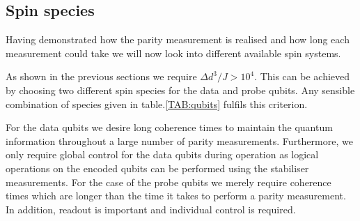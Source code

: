 
\subsection{Spin species}

Having demonstrated how the parity measurement is realised and how long each measurement could take we will now look into different available spin systems. 

As shown in the previous sections we require \hbox{$\Delta d^3/ J > 10^4$}. This can be achieved by choosing two different spin species for the data and probe qubits. Any sensible combination of species given in table.\@ \ref*{TAB:qubits} fulfils this criterion.

For the data qubits we desire long coherence times to maintain the quantum information throughout a large number of parity measurements. Furthermore, we only require global control for the data qubits during operation as logical operations on the encoded qubits can be performed using the stabiliser measurements.
For the case of the probe qubits we merely require coherence times which are longer than the time it takes to perform a parity measurement. In addition, readout is important and individual control is required.

